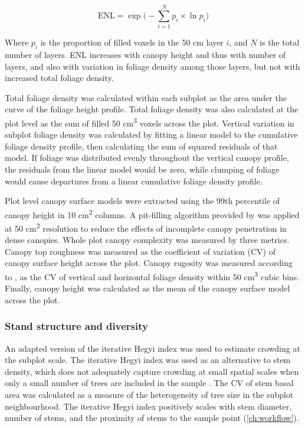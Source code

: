 \begin{refsection}
\begin{equation}
	\text{ENL} = \exp\Big(-\sum_{i=1}^{N} p_{i} \times \ln p_{i} \Big)
\end{equation}

Where $p_{i}$ is the proportion of filled voxels in the 50 cm layer $i$, and $N$ is the total number of layers. ENL increases with canopy height and thus with number of layers, and also with variation in foliage density among those layers, but not with increased total foliage density.

Total foliage density was calculated within each subplot as the area under the curve of the foliage height profile. Total foliage density was also calculated at the plot level as the sum of filled 50 cm\textsuperscript{3} voxels across the plot. Vertical variation in subplot foliage density was calculated by fitting a linear model to the cumulative foliage density profile, then calculating the sum of squared residuals of that model. If foliage was distributed evenly throughout the vertical canopy profile, the residuals from the linear model would be zero, while clumping of foliage would cause departures from a linear cumulative foliage density profile.

Plot level canopy surface models were extracted using the 99th percentile of canopy height in 10 cm\textsuperscript{2} columns. A pit-filling algorithm provided by \citet{Khosravipour2014} was applied at 50 cm\textsuperscript{2} resolution to reduce the effects of incomplete canopy penetration in dense canopies. Whole plot canopy complexity was measured by three metrics. Canopy top roughness was measured as the coefficient of variation (CV) of canopy surface height across the plot. Canopy rugosity was measured according to \citet{Hardiman2011}, as the CV of vertical and horizontal foliage density within 50 cm\textsuperscript{3} cubic bins. Finally, canopy height was calculated as the mean of the canopy surface model across the plot.

\subsubsection{Stand structure and diversity}
\label{tls:sssec:structure_metrics}

An adapted version of the iterative Hegyi index was used to estimate crowding at the subplot scale. The iterative Hegyi index was used as an alternative to stem density, which does not adequately capture crowding at small spatial scales when only a small number of trees are included in the sample \citep{Hegyi1974}. The CV of stem basal area was calculated as a measure of the heterogeneity of tree size in the subplot neighbourhood. The iterative Hegyi index positively scales with stem diameter, number of stems, and the proximity of stems to the sample point (\autoref{ch:workflow}).


\end{refsection}
